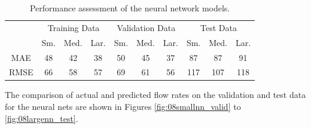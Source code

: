 \begin{table}[h]
\centering
{
\begin{tabular}{c|c|c|c|c|c|c|c|c|c|}
\multicolumn{1}{l|}{} & \multicolumn{3}{c|}{Training Data}                                               & \multicolumn{3}{c|}{Validation Data}                                             & \multicolumn{3}{c|}{Test Data}                                                   \\ \cline{2-10} 
\multicolumn{1}{l|}{} & \multicolumn{1}{c|}{Sm.} & \multicolumn{1}{c|}{Med.} & \multicolumn{1}{c|}{Lar.} & \multicolumn{1}{c|}{Sm.} & \multicolumn{1}{c|}{Med.} & \multicolumn{1}{c|}{Lar.} & \multicolumn{1}{c|}{Sm.} & \multicolumn{1}{c|}{Med.} & \multicolumn{1}{c|}{Lar.} \\ \hline
MAE                   & 48                       & 42                        & 38                        & 50                       & 45                        & 37                        & 87                       & 87                        & 91                        \\
RMSE                  & 66                       & 58                        & 57                        & 69                       & 61                        & 56                        & 117                      & 107                       & 118                       \\
\end{tabular}}
    \caption{Performance assessment of the neural network models.}
    \label{tab:08_nn}
\end{table}

The comparison of actual and predicted flow rates on the validation and test data for the neural nets are shown in Figures \ref{fig:08smallnn_valid} to \ref{fig:08largenn_test}.  

